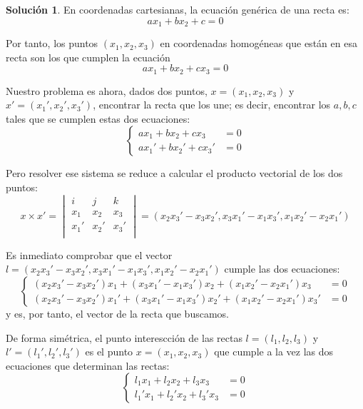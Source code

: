 \documentclass[a4paper, 11pt]{article}
\theoremstyle{definition}
\newtheorem*{solucion}{Solución}
\theoremstyle{theorem}
\begin{document}
  \begin{solucion}
      En coordenadas cartesianas, la ecuación genérica de una recta es:
      \[
      ax_1 + bx_2 + c = 0
      \]

      Por tanto, los puntos $(x_1,x_2,x_3)$ en coordenadas homogéneas que están en esa recta son los que cumplen la ecuación
      \[
      ax_1 + bx_2 + cx_3 = 0
      \]

      Nuestro problema es ahora, dados dos puntos, $x=(x_1,x_2,x_3)$ y $x'=(x_1',x_2',x_3')$, encontrar la recta que los une; es decir, encontrar los $a,b,c$ tales que se cumplen estas dos ecuaciones:
      \[
      \begin{cases}
          ax_1 + bx_2 + cx_3 &= 0 \\
          ax_1' + bx_2' + cx_3' &= 0
      \end{cases}
      \]

      Pero resolver ese sistema se reduce a calcular el producto vectorial de los dos puntos:
      \[
      x \times x' =
      \begin{vmatrix}
          i & j & k \\
          x_1 & x_2 & x_3 \\
          x_1' & x_2' & x_3' \\
      \end{vmatrix} =
      (x_2x_3'-x_3x_2', x_3x_1'-x_1x_3', x_1x_2'-x_2x_1')
      \]

      Es inmediato comprobar que el vector $l = (x_2x_3'-x_3x_2', x_3x_1'-x_1x_3', x_1x_2'-x_2x_1')$ cumple las dos ecuaciones:
      \[
      \begin{cases}
          (x_2x_3'-x_3x_2')x_1 + (x_3x_1'-x_1x_3')x_2 + (x_1x_2'-x_2x_1')x_3 &= 0 \\
          (x_2x_3'-x_3x_2')x_1' + (x_3x_1'-x_1x_3')x_2' + (x_1x_2'-x_2x_1')x_3' &= 0
      \end{cases}
      \]
      y es, por tanto, el vector de la recta que buscamos.

      De forma simétrica, el punto interescción de las rectas $l=(l_1,l_2,l_3)$ y $l'=(l_1',l_2',l_3')$ es el punto $x=(x_1,x_2,x_3)$ que cumple a la vez las dos ecuaciones que determinan las rectas:
      \[
      \begin{cases}
          l_1x_1 + l_2x_2 + l_3x_3 &= 0 \\
          l_1'x_1 + l_2'x_2 + l_3'x_3 &= 0
      \end{cases}
      \]


\end{solucion}
\end{document}
